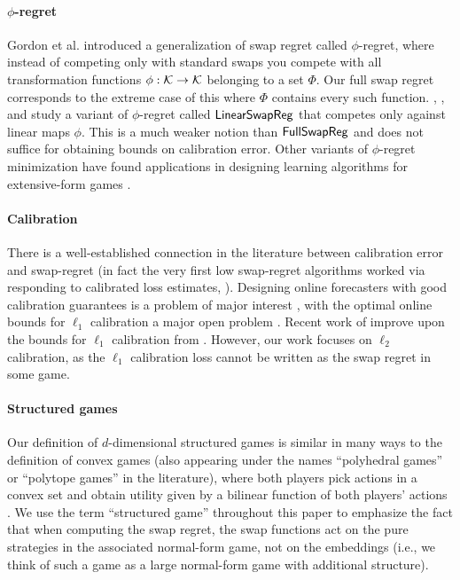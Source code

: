 \documentclass[final,12pt]{alt2025}
\begin{document}
\paragraph{$\phi$-regret} Gordon et al. \citep{GordonGreenwaldMarks2008} introduced a generalization of swap regret called $\phi$-regret, where instead of competing only with standard swaps you compete with all transformation functions $\phi:\mathcal{K}\rightarrow \mathcal{K}$ belonging to a set $\Phi$. Our full swap regret corresponds to the extreme case of this where $\Phi$ contains every such function. \cite{mansour2022strategizing}, \cite{farina2024polynomial}, and \cite{daskalakis2024efficient} study a variant of $\phi$-regret called $\mathsf{LinearSwapReg}$ that competes only against linear maps $\phi$. This is a much weaker notion than $\mathsf{FullSwapReg}$ and does not suffice for obtaining bounds on calibration error.  Other variants of $\phi$-regret minimization have found applications in designing learning algorithms for extensive-form games \citep{celli2021decentralized, bai2022efficient, zhang2024efficient}. 

\paragraph{Calibration} There is a well-established connection in the literature between calibration error and swap-regret \citep{cesa2006prediction} (in fact the very first low swap-regret algorithms worked via responding to calibrated loss estimates, \cite{foster1997calibrated}). Designing online forecasters with good calibration guarantees is a problem of major interest \citep{brier1950verification,murphy1972scalar,murphy1973new,foster1998asymptotic, kleinberg2023u, gopalan2022omnipredictors}, with the optimal online bounds for $\ell_1$ calibration a major open problem \citep{qiao2021stronger}. Recent work of \cite{dagan2024breakingt23barriersequential} improve upon the bounds for $\ell_1$ calibration from \cite{qiao2021stronger}. However, our work focuses on $\ell_2$ calibration, as the $\ell_1$ calibration loss cannot be written as the swap regret in some game. 

\paragraph{Structured games} Our definition of $d$-dimensional structured games is similar in many ways to the definition of convex games (also appearing under the names ``polyhedral games'' or ``polytope games'' in the literature), where both players pick actions in a convex set and obtain utility given by a bilinear function of both players' actions \citep{GordonGreenwaldMarks2008, chakrabarti2024efficient, mansour2022strategizing}. We use the term ``structured game'' throughout this paper to emphasize the fact that when computing the swap regret, the swap functions act on the pure strategies in the associated normal-form game, not on the embeddings (i.e., we think of such a game as a large normal-form game with additional structure). 
\end{document}
